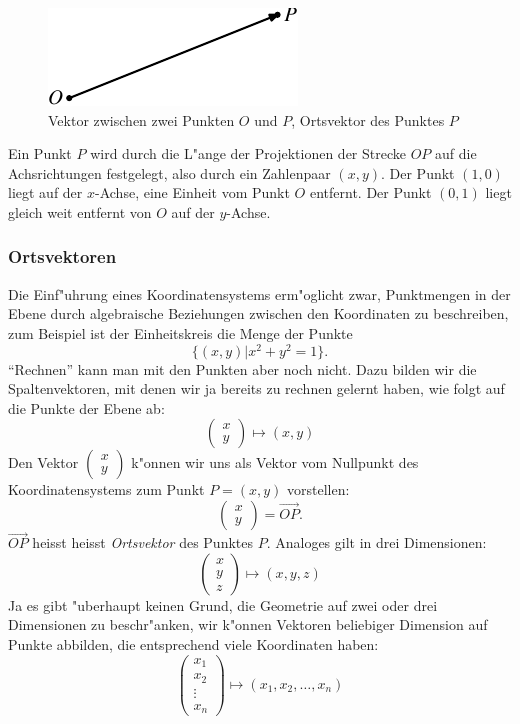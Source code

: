 \begin{figure}
\begin{center}
\includegraphics{images/v-1}
\end{center}
\caption{Vektor zwischen zwei Punkten $O$ und $P$, Ortsvektor des Punktes $P$
\label{image-vektor}}
\end{figure}
Ein Punkt $P$ wird durch die L"ange der Projektionen der Strecke $OP$
auf die Achsrichtungen festgelegt, also durch ein Zahlenpaar $(x,y)$.
Der Punkt $(1,0)$ liegt auf der $x$-Achse, eine Einheit vom Punkt $O$
entfernt. Der Punkt $(0,1)$ liegt gleich weit entfernt von $O$ auf der
$y$-Achse.

\subsubsection{Ortsvektoren}
Die Einf"uhrung eines Koordinatensystems erm"oglicht zwar, Punktmengen
in der Ebene durch algebraische Beziehungen zwischen den Koordinaten
zu beschreiben, zum Beispiel ist der Einheitskreis die Menge der
Punkte
\[
\{(x,y)|x^2+y^2=1\}.
\]
``Rechnen'' kann man mit den Punkten aber noch nicht. Dazu bilden wir
die Spaltenvektoren, mit denen wir ja bereits zu rechnen gelernt haben,
wie folgt auf die Punkte der Ebene ab:
\[
\begin{pmatrix}x\\y\end{pmatrix}
\mapsto (x,y)
\]
Den Vektor $\begin{pmatrix}x\\y\end{pmatrix}$ k"onnen wir uns als
Vektor vom Nullpunkt des Koordinatensystems zum Punkt $P=(x,y)$ vorstellen:
\[
\begin{pmatrix}x\\y\end{pmatrix}
=
\overset{\rightarrow}{OP}.
\]
$\overrightarrow{OP}$ heisst
heisst {\em Ortsvektor} des Punktes $P$.
Analoges gilt in drei Dimensionen:
\[
\begin{pmatrix}x\\y\\z\end{pmatrix}
\mapsto
(x,y,z)
\]
Ja es gibt "uberhaupt keinen Grund, die Geometrie auf zwei oder drei
Dimensionen zu beschr"anken, wir k"onnen Vektoren beliebiger Dimension
auf Punkte
abbilden, die entsprechend viele Koordinaten haben:
\[
\begin{pmatrix}
x_1\\x_2\\\vdots\\x_n
\end{pmatrix}
\mapsto
(x_1,x_2,\dots,x_n)
\]


